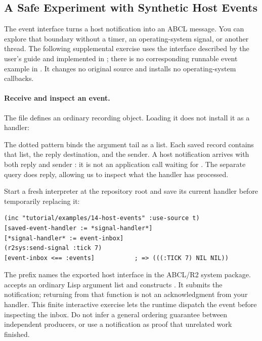 \subsection{A Safe Experiment with Synthetic Host Events}
\label{sec:host-events}

The event interface turns a host notification into an ABCL message.
You can explore that boundary without a timer, an operating-system signal,
or another thread. The following supplemental exercise uses the interface
described by the user's guide and implemented in ;
there is no corresponding runnable event example in .
It changes no original source and installs no operating-system callbacks.

\paragraph{Receive and inspect an event.}
The file  defines an
ordinary recording object. Loading it does not install it as a handler:


The dotted pattern  binds the argument tail
as a list. Each saved record contains that list, the reply destination,
and the sender. A host notification arrives with both reply and sender
: it is not an application call waiting for \code{!}.
The separate  query does reply, allowing us to inspect
what the handler has processed.

Start a fresh interpreter at the repository root and save its current
handler before temporarily replacing it:

\begin{codeblock}
\begin{lstlisting}
(inc "tutorial/examples/14-host-events" :use-source t)
[saved-event-handler := *signal-handler*]
[*signal-handler* := event-inbox]
(r2sys:send-signal :tick 7)
[event-inbox <== :events]           ; => (((:TICK 7) NIL NIL))
\end{lstlisting}
\end{codeblock}

The  prefix names the exported host interface in the
ABCL/R2 system package.  accepts an ordinary Lisp
 argument list and constructs .
It submits the notification; returning from that function is not an
acknowledgment from your handler. This finite interactive exercise lets
the runtime dispatch the event before inspecting the inbox. Do not infer
a general ordering guarantee between independent producers, or use a
notification as proof that unrelated work finished.

